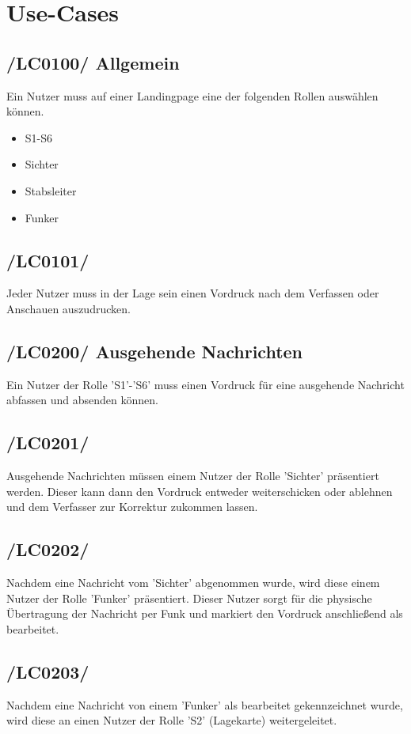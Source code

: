 \section{Use-Cases}
\subsection{/LC0100/ Allgemein}
Ein Nutzer muss auf einer Landingpage eine der folgenden Rollen auswählen können.
\begin{itemize}
\item S1-S6
\item Sichter
\item Stabsleiter
\item Funker
\end{itemize}

\subsection{/LC0101/}
Jeder Nutzer muss in der Lage sein einen Vordruck nach dem Verfassen oder Anschauen auszudrucken.

\subsection{/LC0200/ Ausgehende Nachrichten} 
Ein Nutzer der Rolle 'S1'-'S6' muss einen Vordruck für eine ausgehende Nachricht abfassen und absenden können.

\subsection{/LC0201/}
Ausgehende Nachrichten müssen einem Nutzer der Rolle 'Sichter' präsentiert werden. Dieser kann dann den Vordruck entweder weiterschicken oder ablehnen und dem Verfasser zur Korrektur zukommen lassen.

\subsection{/LC0202/}
Nachdem eine Nachricht vom 'Sichter' abgenommen wurde, wird diese einem Nutzer der Rolle 'Funker' präsentiert. Dieser Nutzer sorgt für die physische Übertragung der Nachricht per Funk und markiert den Vordruck anschließend als bearbeitet.

\subsection{/LC0203/}
Nachdem eine Nachricht von einem 'Funker' als bearbeitet gekennzeichnet wurde, wird diese an einen Nutzer der Rolle 'S2' (Lagekarte) weitergeleitet.

